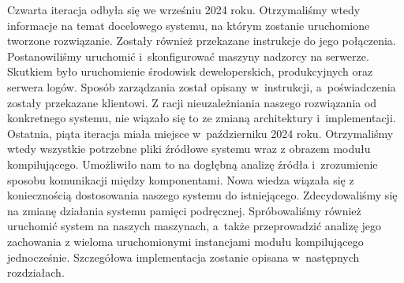 Czwarta iteracja odbyła się we wrześniu 2024 roku. Otrzymaliśmy wtedy informacje na temat docelowego systemu, na którym zostanie uruchomione tworzone rozwiązanie. Zostały również przekazane instrukcje do jego połączenia. Postanowiliśmy uruchomić i~skonfigurować maszyny nadzorcy na serwerze. Skutkiem było uruchomienie środowisk deweloperskich, produkcyjnych oraz serwera logów. Sposób zarządzania został opisany w~instrukcji, a~poświadczenia zostały przekazane klientowi. Z racji nieuzależniania naszego rozwiązania od konkretnego systemu, nie wiązało się to ze zmianą architektury i~implementacji. 
\newline \indent Ostatnia, piąta iteracja miała miejsce w~październiku 2024 roku. Otrzymaliśmy wtedy wszystkie potrzebne pliki źródłowe systemu wraz z obrazem modułu kompilującego. Umożliwiło nam to na dogłębną analizę źródła i~zrozumienie sposobu komunikacji między komponentami. Nowa wiedza wiązała się z koniecznością dostosowania naszego systemu do istniejącego. Zdecydowaliśmy się na zmianę działania systemu pamięci podręcznej. Spróbowaliśmy również uruchomić system na naszych maszynach, a~także przeprowadzić analizę jego zachowania z wieloma uruchomionymi instancjami modułu kompilującego jednocześnie. Szczegółowa implementacja zostanie opisana w~następnych rozdziałach.
